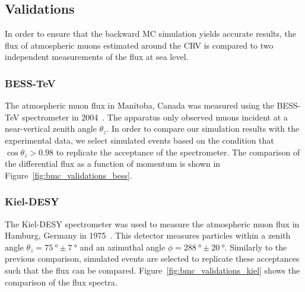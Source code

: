 
\subsection{Validations}
In order to ensure that the backward MC simulation yields accurate results, the
flux of atmospheric muons estimated around the CRV is compared to two
independent measurements of the flux at sea level.

\subsubsection{BESS-TeV}
The atmospheric muon flux in Manitoba, Canada was measured using the BESS-TeV
spectrometer in 2004~\cite{besstev}. The apparatus only observed muons incident
at a near-vertical zenith angle $\theta_z$. In order to compare our simulation
results with the experimental data, we select simulated events based on the
condition that $\cos \theta_z > 0.98$ to replicate the acceptance of the
spectrometer. The comparison of the differential flux as a function of momentum
is shown in Figure~\ref{fig:bmc_validations_bess}.

\subsubsection{Kiel-DESY}
The Kiel-DESY spectrometer was used to measure the atmospheric muon flux in
Hamburg, Germany in 1975~\cite{kieldesy}. This detector measures particles
within a zenith angle $\theta_z =\SI{75}{\degree} \pm \SI{7}{\degree}$ and an
azimuthal angle $\phi = \SI{288}{\degree} \pm \SI{20}{\degree}$. Similarly to
the previous comparison, simulated events are selected to replicate these
acceptances such that the flux can be compared.
Figure~\ref{fig:bmc_validations_kiel} shows the comparison of the flux spectra.

